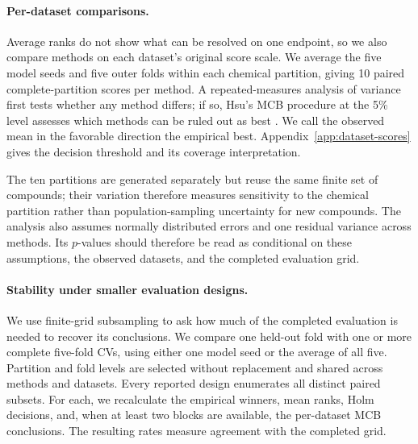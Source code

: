 \paragraph{Per-dataset comparisons.}
Average ranks do not show what can be resolved on one endpoint, so we also compare methods on each
dataset's original score scale. We average the five model seeds and five outer folds within each
chemical partition, giving 10 paired complete-partition scores per method. A repeated-measures
analysis of variance first tests whether any method differs; if so, Hsu's MCB procedure at the 5\%
level assesses which methods can be ruled out as best \citep{hsu1984constrained}. We call the
observed mean in the favorable direction the empirical best. Appendix~\ref{app:dataset-scores}
gives the decision threshold and its coverage interpretation.

The ten partitions are generated separately but reuse the same finite set of compounds; their
variation therefore measures sensitivity to the chemical partition rather than population-sampling
uncertainty for new compounds. The analysis also assumes normally distributed errors and one residual
variance across methods. Its $p$-values should therefore be read as conditional on these assumptions,
the observed datasets, and the completed evaluation grid.

\paragraph{Stability under smaller evaluation designs.}
We use finite-grid subsampling to ask how much of the completed evaluation is needed to recover its
conclusions. We compare one held-out fold with one or more complete five-fold CVs, using either one
model seed or the average of all five. Partition and fold levels are selected without replacement
and shared across methods and datasets. Every reported design enumerates all distinct paired
subsets. For each, we recalculate
the empirical winners, mean ranks, Holm decisions, and, when at least two blocks are available, the
per-dataset MCB conclusions. The resulting rates measure agreement with the completed grid.
